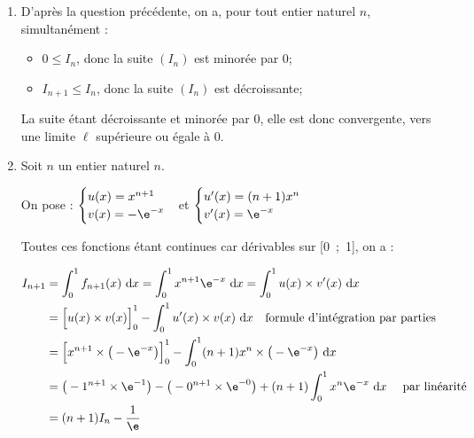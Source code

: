 \begin{enumerate}
\begin{enumerate}
Comme on intègre entre 0 et 1, avec $0 < 1$, par positivité de l'intégrale, on en déduit :

$\displaystyle \int_{0}^{1} 0 ~\mathrm{d}x \leqslant \int_{0}^{1} f_{n+1}(x)~\mathrm{d}x \leqslant \int_{0}^{1}f_n(x)~\mathrm{d}x$\quad soit \quad $0 \leqslant I_{n+1} \leqslant I_n$.
	\end{enumerate}

	\item D'après la question précédente, on a, pour tout entier naturel $n$, simultanément :
	\begin{itemize}
		\item $0 \leqslant I_n$, \quad donc la suite $(I_n)$ est minorée par 0;
		\item $I_{n+1} \leqslant I_n$, \quad donc la suite $(I_n)$ est décroissante;
	\end{itemize}

La suite étant décroissante et minorée par 0, elle est donc convergente, vers une limite $\ell$ supérieure ou égale à 0.

	\item Soit $n$ un entier naturel $n$.

On pose : \quad $\begin{cases}
u(x) = x^{n+1} \\
v(x) = -\e^{-x}
\end{cases}$\quad et \quad $\begin{cases}
u'(x) = (n+1) x^{n} \\
v'(x) = \e^{-x}
\end{cases}$

Toutes ces fonctions étant continues car dérivables sur [0~;~1], on a :

$\begin{aligned}[t] \displaystyle
I_{n+1} &= \int_{0}^{1} f_{n+1}(x) ~\mathrm{d}x
		= \int_{0}^{1} x^{n+1}\e^{-x} ~\mathrm{d}x
		= \int_{0}^{1} u(x)\times v'(x) ~\mathrm{d}x\\
		&= \Big[u(x) \times v(x) \Big]_0^1 - \int_{0}^{1} u'(x)\times v(x) ~\mathrm{d}x\quad \text{formule d'intégration par parties}\\
		&= \Big[x^{n+1} \times \big(-\e^{-x}\big)\Big]_0^1 - \int_{0}^{1} (n+1)x^{n} \times \big(-\e^{-x}\big)~\mathrm{d}x	\\
		&=\big(-1^{n+1}\times \e^{-1}\big) - \big(-0^{n+1}\times \e^{-0}\big) +(n+1)\int_{0}^{1} x^{n} \e^{-x}~\mathrm{d}x\quad\text{ par linéarité}\\
		&=(n+1)I_n - \dfrac{1}{\e}
\end{aligned}$


\end{enumerate}
